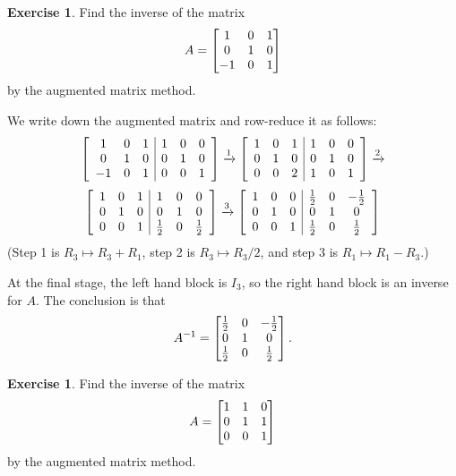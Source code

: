 \documentclass[a4paper]{book}
\theoremstyle{definition}
\newtheorem{exercise}[theorem]{Exercise}
\renewenvironment{solution}{\SolutionInline}{\endSolutionInline}
\begin{document}
\begin{exercise}
 Find the inverse of the matrix
 \[ A = \begin{bmatrix} 1&0&1\\ 0&1&0\\ -1&0&1 \end{bmatrix} \]
 by the augmented matrix method.
\end{exercise}
\begin{solution}
 We write down the augmented matrix and row-reduce it as follows:
 {\newcommand{\h}{\tfrac{1}{2}}\small 
  \[
   \left[\begin{array}{ccc|ccc}
     1& 0& 1 &  1& 0& 0 \\
     0& 1& 0 &  0& 1& 0 \\
    -1& 0& 1 &  0& 0& 1
   \end{array}\right] \xrightarrow{1}
   \left[\begin{array}{ccc|ccc}
     1& 0& 1 &  1& 0& 0 \\
     0& 1& 0 &  0& 1& 0 \\
     0& 0& 2 &  1& 0& 1
   \end{array}\right] \xrightarrow{2}
  \] \[
   \left[\begin{array}{ccc|ccc}
     1& 0& 1 &  1& 0& 0 \\
     0& 1& 0 &  0& 1& 0 \\
     0& 0& 1 & \h& 0&\h
   \end{array}\right] \xra{3}
   \left[\begin{array}{ccc|ccc}
     1& 0& 0 & \h& 0&-\h \\
     0& 1& 0 &  0& 1& 0 \\
     0& 0& 1 & \h& 0&\h
   \end{array}\right]
  \]}
 (Step 1 is $R_3\mapsto R_3+R_1$, step 2 is $R_3\mapsto R_3/2$, and
 step 3 is $R_1\mapsto R_1-R_3$.)

 At the final stage, the left hand block is $I_3$, so the right hand
 block is an inverse for $A$.  The conclusion is that 
 \[ A^{-1} =
     \begin{bmatrix} \tfrac{1}{2} & 0 & -\tfrac{1}{2} \\
          0            & 1 & 0             \\
          \tfrac{1}{2} & 0 & \tfrac{1}{2} \end{bmatrix}.
 \]
\end{solution}
\begin{exercise}
 Find the inverse of the matrix
 \[ A = \begin{bmatrix} 1&1&0\\ 0&1&1\\ 0&0&1 \end{bmatrix} \]
 by the augmented matrix method.
\end{exercise}
\end{document}
